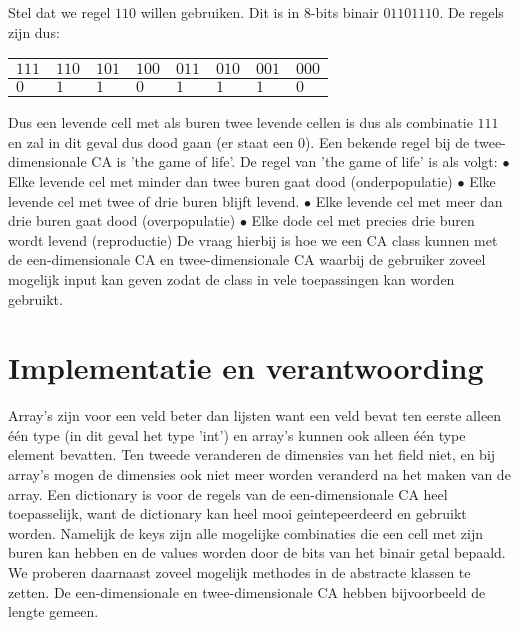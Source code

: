 \documentclass[12pt,a4paper]{article}
\begin{document}
Stel dat we regel $110$ willen gebruiken. Dit is in 8-bits binair $01101110$.
De regels zijn dus:
\begin{center}
\begin{tabular}{|m{0.6cm}|m{0.6cm}|m{0.6cm}|m{0.6cm}|m{0.6cm}|m{0.6cm}|m{0.6cm}|m{0.6cm}|}
    \hline
    $111$ & $110$ & $101$ & $100$ & $011$ & $010$ & $001$ & $000$ \\
    \hline
    $0$ & $1$ & $1$ & $0$ & $1$ & $1$ & $1$ & $0$ \\
    \hline
\end{tabular}
\end{center}
\vspace{10pt}
Dus een levende cell met als buren twee levende cellen is dus als combinatie $111$ en zal in dit geval dus dood gaan (er staat een $0$).
Een bekende regel bij de twee-dimensionale CA is 'the game of life'. 
\newline
De regel van 'the game of life' is als volgt:
\vspace{4pt}
\newline
$\bullet$ Elke levende cel met minder dan twee buren gaat dood (onderpopulatie) 
\newline 
$\bullet$ Elke levende cel met twee of drie buren blijft levend.
\newline
$\bullet$ Elke levende cel met meer dan drie buren gaat dood (overpopulatie)
\newline 
$\bullet$ Elke dode cel met precies drie buren wordt levend (reproductie) 
\newline
\vspace{8pt}
De vraag hierbij is hoe we een CA class kunnen met de een-dimensionale CA en twee-dimensionale CA
waarbij de gebruiker zoveel mogelijk input kan geven zodat de class in vele toepassingen kan worden gebruikt. 


\section*{Implementatie en verantwoording}
Array's zijn voor een veld beter dan lijsten want een veld bevat ten eerste alleen één type (in dit geval het type 'int') 
en array's kunnen ook alleen één type element bevatten.  
Ten tweede veranderen de dimensies van het field niet, en bij array's mogen de dimensies ook niet meer worden veranderd na
het maken van de array. Een dictionary is voor de regels van de een-dimensionale CA heel toepasselijk, want 
de dictionary kan heel mooi geintepeerdeerd en gebruikt worden. 
Namelijk de keys zijn alle mogelijke combinaties die een cell met zijn buren kan hebben
en de values worden door de bits van het binair getal bepaald. 
We proberen daarnaast zoveel mogelijk methodes in de abstracte klassen te zetten.
De een-dimensionale en twee-dimensionale CA hebben bijvoorbeeld de lengte gemeen.   
\end{document}
